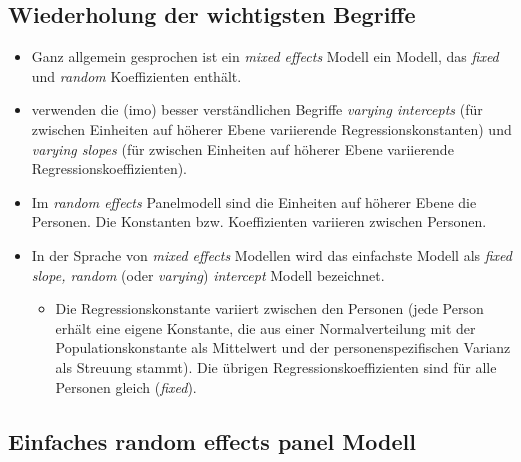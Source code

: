 \documentclass[
]{book}
\providecommand{\tightlist}{%
  \setlength{\itemsep}{0pt}\setlength{\parskip}{0pt}}
\begin{document}
\hypertarget{wiederholung-der-wichtigsten-begriffe}{%
\subsection*{Wiederholung der wichtigsten Begriffe}\label{wiederholung-der-wichtigsten-begriffe}}

\begin{itemize}
\tightlist
\item
  Ganz allgemein gesprochen ist ein \emph{mixed effects} Modell ein Modell, das \emph{fixed} und \emph{random} Koeffizienten enthält.
\item
  \citet{gelmanDataAnalysisUsing2006} verwenden die (imo) besser verständlichen Begriffe \emph{varying intercepts} (für zwischen Einheiten auf höherer Ebene variierende Regressionskonstanten) und \emph{varying slopes} (für zwischen Einheiten auf höherer Ebene variierende Regressionskoeffizienten).
\item
  Im \emph{random effects} Panelmodell sind die Einheiten auf höherer Ebene die Personen. Die Konstanten bzw. Koeffizienten variieren zwischen Personen.
\item
  In der Sprache von \emph{mixed effects} Modellen wird das einfachste Modell als \emph{fixed slope, random} (oder \emph{varying}) \emph{intercept} Modell bezeichnet.

  \begin{itemize}
  \tightlist
  \item
    Die Regressionskonstante variiert zwischen den Personen (jede Person erhält eine eigene Konstante, die aus einer Normalverteilung mit der Populationskonstante als Mittelwert und der personenspezifischen Varianz als Streuung stammt).
    Die übrigen Regressionskoeffizienten sind für alle Personen gleich (\emph{fixed}).
  \end{itemize}
\end{itemize}

\hypertarget{einfaches-random-effects-panel-modell}{%
\subsection*{Einfaches random effects panel Modell}\label{einfaches-random-effects-panel-modell}}
\end{document}

